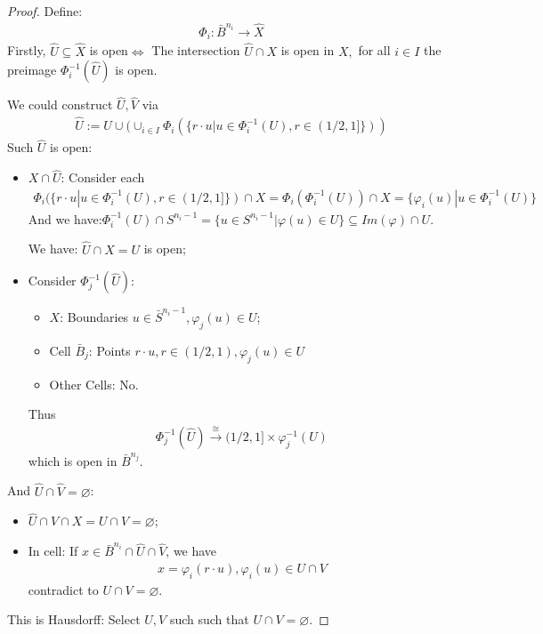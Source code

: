 \documentclass[Total.tex]{subfiles}
\begin{document}
	\begin{proof}
		Define: 
		\begin{gather*}
			\Phi_i:\bar{B}^{n_i}\rightarrow \hat{X}
		\end{gather*}
		Firstly, $\hat{U}\subseteq \hat{X}$ is open$\Leftrightarrow$ The intersection $\hat{U}\cap X$ is open in $X,$ for all $i\in I$ the preimage $\Phi_i^{-1}(\hat{U})$ is open.
		
		We could construct $\hat{U},\hat{V}$ via
		\begin{gather*}
			\hat{U}:=U\cup (\cup_{i\in I}\Phi_i(\{r\cdot u|u\in \Phi_i^{-1}(U),r\in (1/2,1]\}))
		\end{gather*}
		Such $\hat{U}$ is open:
		\begin{itemize}
			\item $X\cap \hat{U}$: Consider each 
			\begin{gather*}
				\Phi_i(\{r\cdot u|u\in \Phi_i^{-1}(U),r\in (1/2,1]\})\cap X=\Phi_i(\Phi_i^{-1}(U))\cap X=\{\varphi_i(u)|u\in \Phi_i^{-1}(U)\}
			\end{gather*} 
			And we have:$\Phi_i^{-1}(U)\cap S^{n_i-1}=\{u\in S^{n_i-1}|\varphi(u)\in U\}\subseteq Im(\varphi)\cap U$. 
			
			We have: $\hat{U}\cap X=U$ is open;
			\item Consider $\Phi_j^{-1}(\hat{U})$:
			\begin{itemize}
				\item $X$: Boundaries $u\in \bar{S}^{n_i-1},\varphi_j(u)\in U$;
				\item Cell $\bar{B}_j$: Points $r\cdot u,r\in (1/2,1),\varphi_j(u)\in U$
				\item Other Cells: No.
			\end{itemize}
			Thus
			\begin{gather*}
				\Phi_j^{-1}(\hat{U})\stackrel{\cong}{\rightarrow} (1/2,1]\times \varphi_j^{-1}(U)
			\end{gather*}
			which is open in $\bar{B}^{n_j}$.
		\end{itemize}
		And $\hat{U}\cap \hat{V}=\varnothing$:
		\begin{itemize}
			\item $\hat{U}\cap\hat{V}\cap X=U\cap V=\varnothing$;
			\item In cell: If $x\in \bar{B}^{n_i}\cap \hat{U}\cap \hat{V}$, we have
			\begin{gather*}
				x=\varphi_i(r\cdot u),\varphi_i(u)\in U\cap V
			\end{gather*} 
			contradict to $U\cap V=\varnothing$.
		\end{itemize}
		
		This is Hausdorff: Select $U,V$ such such that $U\cap V=\varnothing$.
	\end{proof}
	
\end{document}
